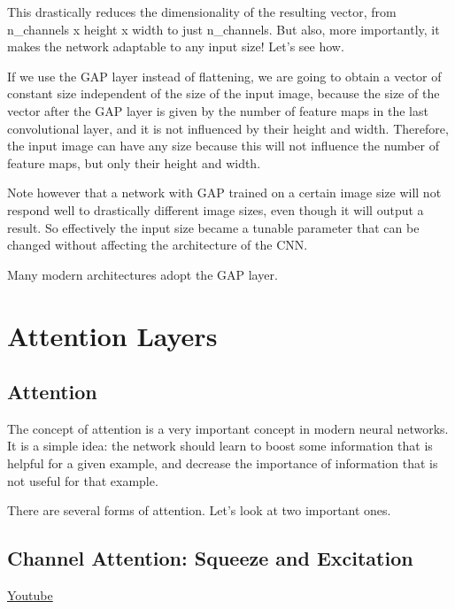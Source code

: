 This drastically reduces the dimensionality of the resulting vector, from n\_channels x height x width to just n\_channels. But also, more importantly, it makes the network adaptable to any input size! Let's see how.\newline

If we use the GAP layer instead of flattening, we are going to obtain a vector of constant size independent of the size of the input image, because the size of the vector after the GAP layer is given by the number of feature maps in the last convolutional layer, and it is not influenced by their height and width. Therefore, the input image can have any size because this will not influence the number of feature maps, but only their height and width.\newline

Note however that a network with GAP trained on a certain image size will not respond well to drastically different image sizes, even though it will output a result. So effectively the input size became a tunable parameter that can be changed without affecting the architecture of the CNN.\newline

Many modern architectures adopt the GAP layer.

\section{Attention Layers}

\subsection{Attention}

The concept of attention is a very important concept in modern neural networks. It is a simple idea: the network should learn to boost some information that is helpful for a given example, and decrease the importance of information that is not useful for that example. \newline

There are several forms of attention. Let's look at two important ones.

\subsection{Channel Attention: Squeeze and Excitation}
\href{https://www.youtube.com/watch?v=ph43iEgPx6I&ab_channel=Udacity}{Youtube} \newline

